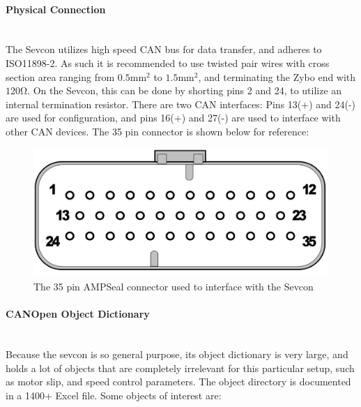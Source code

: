 

\paragraph*{Physical Connection}\label{sub:sevcon_physical_connection}~\\
The Sevcon utilizes high speed CAN bus for data transfer, and adheres to ISO11898-2.
As such it is recommended to use twisted pair wires with cross section area ranging from $0.5 \si{\milli \meter \squared}$ to $1.5 \si{\milli \meter \squared}$, and terminating the Zybo end with $120 \si{\ohm}$.
On the Sevcon, this can be done by shorting pins 2 and 24, to utilize an internal termination resistor.
There are two CAN interfaces: Pins 13(+) and 24(-) are used for configuration, and pins 16(+) and 27(-) are used to interface with other CAN devices.
The 35 pin connector is shown below for reference:

\begin{figure}[h]
	\centering
	\includegraphics[width = 0.6\linewidth]{graphics/35_pin_dsub}
	\caption{The 35 pin AMPSeal connector used to interface with the Sevcon}
	\label{fig:35_pin_dsub}
\end{figure}

\paragraph*{CANOpen Object Dictionary}\label{sub:sevcon_object_dictionary}~\\
Because the sevcon is so general purpose, its object dictionary is very large, and holds a lot of objects that are completely irrelevant for this particular setup, such as motor slip, and speed control parameters. 
The object directory is documented in a 1400+ Excel file. 
Some objects of interest are:

